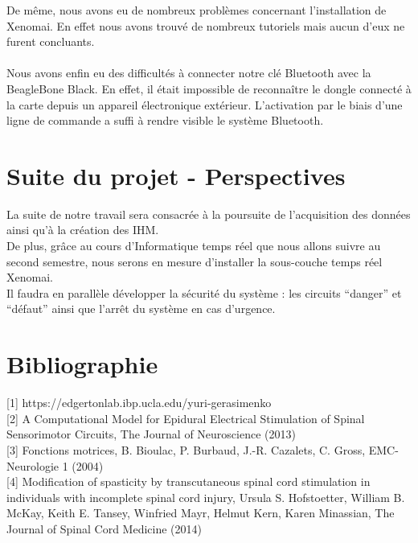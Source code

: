 \documentclass{report}
\begin{document}
De m\^{e}me, nous avons eu de nombreux probl\`{e}mes concernant l’installation de Xenomai. En
effet nous avons trouv\'{e} de nombreux tutoriels mais aucun d’eux ne furent concluants. \\ \\

Nous avons enfin eu des difficult\'{e}s \`{a} connecter notre cl\'{e} Bluetooth avec la BeagleBone
Black. En effet, il \'{e}tait impossible de reconnaître le dongle connect\'{e} \`{a} la carte depuis un
appareil \'{e}lectronique ext\'{e}rieur. L’activation par le biais d’une ligne de commande a suffi \`{a}
rendre visible le syst\`{e}me Bluetooth.

\section{Suite du projet - Perspectives}

La suite de notre travail sera consacr\'{e}e \`{a} la poursuite de l’acquisition des donn\'{e}es ainsi qu’\`{a}
la cr\'{e}ation des IHM.\\
De plus, gr\^{a}ce au cours d’Informatique temps r\'{e}el que nous allons suivre au second
semestre, nous serons en mesure d’installer la sous-couche temps r\'{e}el Xenomai.\\
Il faudra en parall\`{e}le d\'{e}velopper la s\'{e}curit\'{e} du syst\`{e}me : les circuits “danger” et “d\'{e}faut”
ainsi que l'arr\^{e}t du syst\`{e}me en cas d’urgence.



\newpage
\section{Bibliographie\label{bibliographie}}

[1] https://edgertonlab.ibp.ucla.edu/yuri-gerasimenko\\

[2] A Computational Model for Epidural Electrical Stimulation of Spinal Sensorimotor Circuits, The Journal of 
Neuroscience (2013) \\

[3] Fonctions motrices, B. Bioulac, P. Burbaud, J.-R. Cazalets, C. Gross, EMC-Neurologie 1 (2004)\\

[4] Modification of spasticity by transcutaneous spinal cord stimulation in individuals with incomplete spinal cord 
injury, Ursula S. Hofstoetter, William B. McKay, Keith E. Tansey, Winfried Mayr, Helmut Kern, Karen Minassian, The 
Journal of Spinal Cord Medicine (2014)\\
\end{document}
